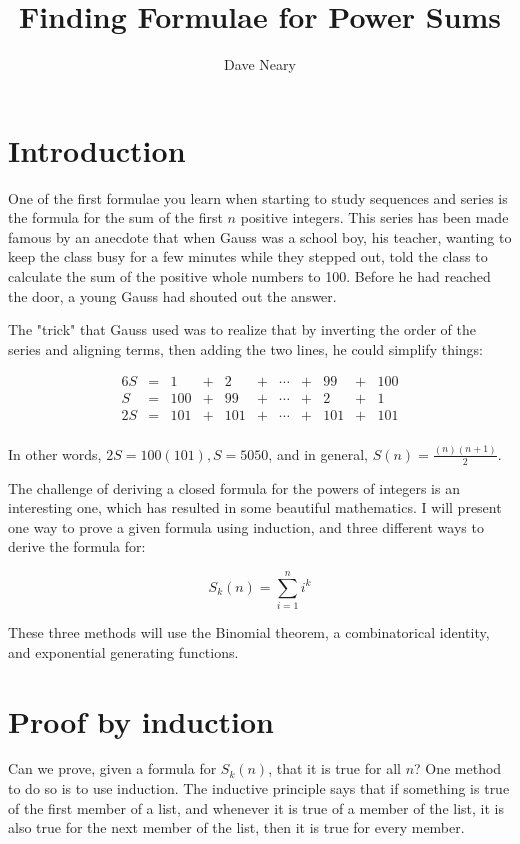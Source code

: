 \documentclass{article}
\begin{document}
\title{Finding Formulae for Power Sums}
\author{Dave Neary}

\maketitle

\section{Introduction}

One of the first formulae you learn when starting to study sequences and series is the
formula for the sum of the first $n$ positive integers. This 
series has been made famous by an anecdote that when Gauss was a school boy, his
teacher, wanting to keep the class busy for a few minutes while they stepped out,
told the class to calculate the sum of the positive whole numbers to 100. Before he
had reached the door, a young Gauss had shouted out the answer.

The "trick" that Gauss used was to realize that by inverting the order of the series
and aligning terms, then adding the two lines, he could simplify things:

\begin{alignat*}{6}
	S &=& 1   &+& 2  &+& \cdots &+& 99 &+& 100 \\
	 S &=& 100 &+& 99 &+& \cdots &+& 2  &+& 1 \\
	2S &=& 101 &+& 101 &+& \cdots &+& 101 &+& 101 \\
\end{alignat*}

In other words, $2S = 100(101), S=5050$, and in general, $S(n) = \frac{(n)(n+1)}{2}$.

The challenge of deriving a closed formula for the powers of integers is an
interesting one, which has resulted in some beautiful mathematics. I will present
one way to prove a given formula using induction, and three different ways to derive
the formula for:

\[ S_k(n) = \sum_{i=1}^{n} i^k \]

These three methods will use the Binomial theorem, a combinatorical identity, and
exponential generating functions.

\section{Proof by induction}

Can we prove, given a formula for $S_k(n)$, that it is true for all $n$? One method
to do so is to use induction. The inductive principle says that if something is true
of the first member of a list, and whenever it is true of a member of the list,
it is also true for the next member of the list, then it is true for every member.
\end{document}
